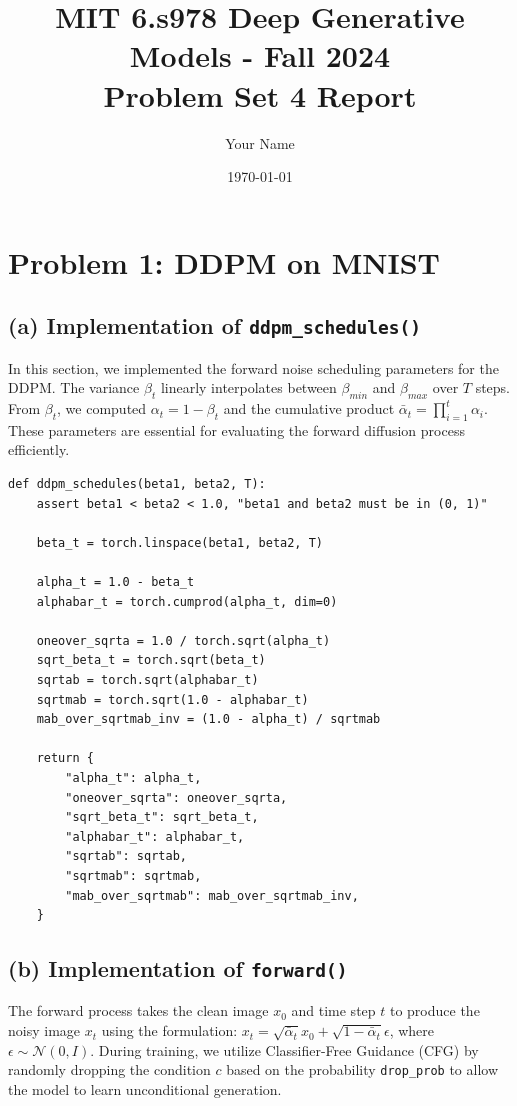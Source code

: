 \documentclass[11pt]{article}
\title{MIT 6.s978 Deep Generative Models - Fall 2024 \\ Problem Set 4 Report}
\author{Your Name}
\date{\today}
\begin{document}
\maketitle

\section*{Problem 1: DDPM on MNIST}

\subsection*{(a) Implementation of \texttt{ddpm\_schedules()}}
In this section, we implemented the forward noise scheduling parameters for the DDPM. 
The variance $\beta_t$ linearly interpolates between $\beta_{min}$ and $\beta_{max}$ over $T$ steps. 
From $\beta_t$, we computed $\alpha_t = 1 - \beta_t$ and the cumulative product $\bar{\alpha}_t = \prod_{i=1}^t \alpha_i$.
These parameters are essential for evaluating the forward diffusion process efficiently.

\begin{lstlisting}[caption={Implementation of \texttt{ddpm\_schedules()}}]
def ddpm_schedules(beta1, beta2, T):
    assert beta1 < beta2 < 1.0, "beta1 and beta2 must be in (0, 1)"

    beta_t = torch.linspace(beta1, beta2, T)
    
    alpha_t = 1.0 - beta_t
    alphabar_t = torch.cumprod(alpha_t, dim=0)
    
    oneover_sqrta = 1.0 / torch.sqrt(alpha_t)
    sqrt_beta_t = torch.sqrt(beta_t)
    sqrtab = torch.sqrt(alphabar_t)
    sqrtmab = torch.sqrt(1.0 - alphabar_t)
    mab_over_sqrtmab_inv = (1.0 - alpha_t) / sqrtmab

    return {
        "alpha_t": alpha_t,
        "oneover_sqrta": oneover_sqrta,
        "sqrt_beta_t": sqrt_beta_t,
        "alphabar_t": alphabar_t,
        "sqrtab": sqrtab,
        "sqrtmab": sqrtmab,
        "mab_over_sqrtmab": mab_over_sqrtmab_inv,
    }
\end{lstlisting}


\subsection*{(b) Implementation of \texttt{forward()}}
The forward process takes the clean image $x_0$ and time step $t$ to produce the noisy image $x_t$ using the formulation:
$x_t = \sqrt{\bar{\alpha}_t}x_0 + \sqrt{1 - \bar{\alpha}_t}\epsilon$, where $\epsilon \sim \mathcal{N}(0, I)$.
During training, we utilize Classifier-Free Guidance (CFG) by randomly dropping the condition $c$ based on the probability \texttt{drop\_prob} to allow the model to learn unconditional generation.
\end{document}
